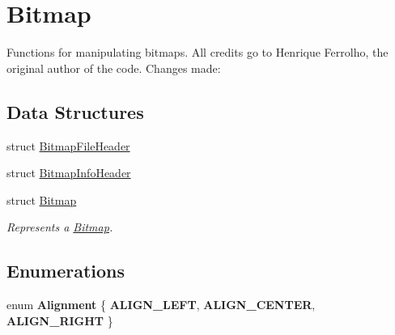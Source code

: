 \hypertarget{group___bitmap}{}\section{Bitmap}
\label{group___bitmap}


Functions for manipulating bitmaps. All credits go to Henrique Ferrolho, the original author of the code. Changes made\+:  


\subsection*{Data Structures}
\begin{DoxyCompactItemize}
\item 
struct \hyperlink{struct_bitmap_file_header}{Bitmap\+File\+Header}
\item 
struct \hyperlink{struct_bitmap_info_header}{Bitmap\+Info\+Header}
\item 
struct \hyperlink{struct_bitmap}{Bitmap}
\begin{DoxyCompactList}\small\item\em Represents a \hyperlink{struct_bitmap}{Bitmap}. \end{DoxyCompactList}\end{DoxyCompactItemize}
\subsection*{Enumerations}
\begin{DoxyCompactItemize}
\item 
\hypertarget{group___bitmap_gacdfaca60ec19c0265bac2692d7982726}{}\label{group___bitmap_gacdfaca60ec19c0265bac2692d7982726} 
enum {\bfseries Alignment} \{ {\bfseries A\+L\+I\+G\+N\+\_\+\+L\+E\+FT}, 
{\bfseries A\+L\+I\+G\+N\+\_\+\+C\+E\+N\+T\+ER}, 
{\bfseries A\+L\+I\+G\+N\+\_\+\+R\+I\+G\+HT}
 \}
\end{DoxyCompactItemize}
